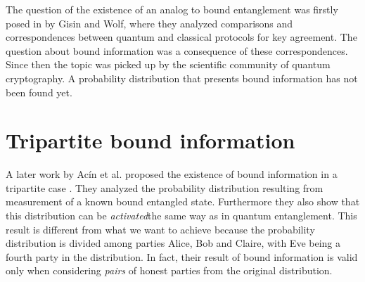 The question of the existence of an analog to bound entanglement was firstly posed in \cite{GisWolf00} by Gisin and Wolf, where they analyzed comparisons and correspondences between quantum and classical protocols for key agreement. 
The question about bound information was a consequence of these correspondences.
Since then the topic was picked up by the scientific community of quantum cryptography.
A probability distribution that presents bound information has not been found yet.

\section{Tripartite bound information}
    A later work by Ac\'in et al. proposed the existence of bound information in a tripartite case \cite{ACM04}. 
    They analyzed the probability distribution resulting from measurement of a known bound entangled state. 
    Furthermore they also show that this distribution can be \textit{activated}\footnotemark the same way as in quantum entanglement.
    This result is different from what we want to achieve because the probability distribution is divided among parties Alice, Bob and Claire, with Eve being a fourth party in the distribution. 
    In fact, their result of bound information is valid only when considering \emph{pairs} of honest parties from the original distribution.
